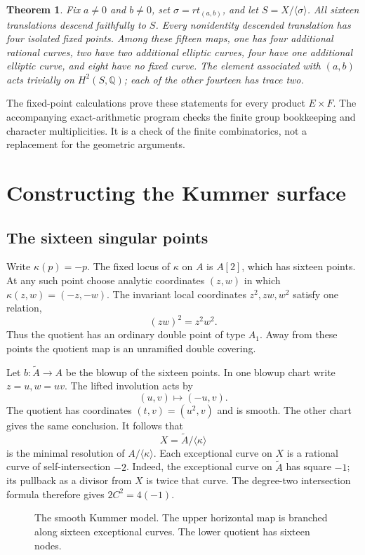 \documentclass[11pt]{amsart}
\newtheorem{theorem}{Theorem}[section]
\theoremstyle{definition}
\newcommand{\Q}{\mathbb Q}\newcommand{\C}{\mathbb C}\newcommand{\Z}{\mathbb Z}
\begin{document}
\begin{theorem}\label{thm:descent-intro}
Fix $a\ne0$ and $b\ne0$, set $\sigma=rt_{(a,b)}$, and let
$S=X/\langle\sigma\rangle$. All sixteen translations descend faithfully
to $S$. Every nonidentity descended translation has four isolated fixed
points. Among these fifteen maps, one has four additional rational
curves, two have two additional elliptic curves, four have one additional
elliptic curve, and eight have no fixed curve. The element associated
with $(a,b)$ acts trivially on $H^2(S,\Q)$; each of the other fourteen
has trace two.
\end{theorem}

The fixed-point calculations prove these statements for every product
$E\times F$. The accompanying exact-arithmetic program checks the finite
group bookkeeping and character multiplicities. It is a check of the
finite combinatorics, not a replacement for the geometric arguments.

\section{Constructing the Kummer surface}
\subsection{The sixteen singular points}
Write $\kappa(p)=-p$. The fixed locus of $\kappa$ on $A$ is $A[2]$,
which has sixteen points. At any such point choose analytic coordinates
$(z,w)$ in which $\kappa(z,w)=(-z,-w)$. The invariant local coordinates
$z^2,zw,w^2$ satisfy one relation,
\[
 (zw)^2=z^2w^2.
\]
Thus the quotient has an ordinary double point of type $A_1$. Away from
these points the quotient map is an unramified double covering.

Let $b:\widetilde A\to A$ be the blowup of the sixteen points. In one
blowup chart write $z=u,w=uv$. The lifted involution acts by
\[
 (u,v)\longmapsto(-u,v).
\]
The quotient has coordinates $(t,v)=(u^2,v)$ and is smooth. The other
chart gives the same conclusion. It follows that
\[
 X=\widetilde A/\langle\kappa\rangle
\]
is the minimal resolution of $A/\langle\kappa\rangle$.
Each exceptional curve on $X$ is a rational curve of self-intersection
$-2$. Indeed, the exceptional curve on $\widetilde A$ has square $-1$;
its pullback as a divisor from $X$ is twice that curve. The degree-two
intersection formula therefore gives $2C^2=4(-1)$.

\begin{figure}[tb]
\centering
{}
\caption{The smooth Kummer model. The upper horizontal map is branched
along sixteen exceptional curves. The lower quotient has sixteen nodes.}
\label{fig:kummer}
\end{figure}
\end{document}
